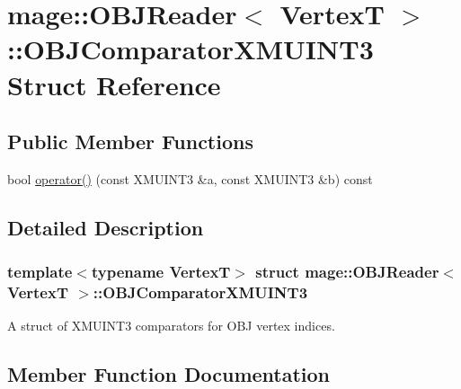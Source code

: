 \hypertarget{structmage_1_1_o_b_j_reader_1_1_o_b_j_comparator_x_m_u_i_n_t3}{}\section{mage\+:\+:O\+B\+J\+Reader$<$ VertexT $>$\+:\+:O\+B\+J\+Comparator\+X\+M\+U\+I\+N\+T3 Struct Reference}
\label{structmage_1_1_o_b_j_reader_1_1_o_b_j_comparator_x_m_u_i_n_t3}
\subsection*{Public Member Functions}
\begin{DoxyCompactItemize}
\item 
bool \hyperlink{structmage_1_1_o_b_j_reader_1_1_o_b_j_comparator_x_m_u_i_n_t3_abe8c653d6d8d24c3001c5dea5061c6c1}{operator()} (const X\+M\+U\+I\+N\+T3 \&a, const X\+M\+U\+I\+N\+T3 \&b) const
\end{DoxyCompactItemize}


\subsection{Detailed Description}
\subsubsection*{template$<$typename VertexT$>$\newline
struct mage\+::\+O\+B\+J\+Reader$<$ Vertex\+T $>$\+::\+O\+B\+J\+Comparator\+X\+M\+U\+I\+N\+T3}

A struct of {\ttfamily X\+M\+U\+I\+N\+T3} comparators for O\+BJ vertex indices. 

\subsection{Member Function Documentation}
\hypertarget{structmage_1_1_o_b_j_reader_1_1_o_b_j_comparator_x_m_u_i_n_t3_abe8c653d6d8d24c3001c5dea5061c6c1}{}\label{structmage_1_1_o_b_j_reader_1_1_o_b_j_comparator_x_m_u_i_n_t3_abe8c653d6d8d24c3001c5dea5061c6c1} 
